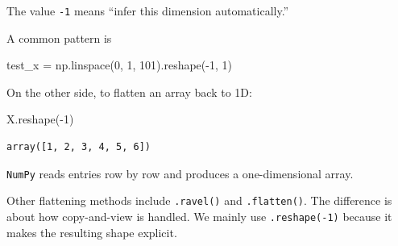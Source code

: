 \documentclass[
  letterpaper,
  DIV=11,
  numbers=noendperiod]{scrreprt}
\newenvironment{Shaded}{\begin{snugshade}}{\end{snugshade}}
\newcommand{\DecValTok}[1]{\textcolor[rgb]{0.68,0.00,0.00}{#1}}
\newcommand{\NormalTok}[1]{\textcolor[rgb]{0.00,0.23,0.31}{#1}}
\newcommand{\OperatorTok}[1]{\textcolor[rgb]{0.37,0.37,0.37}{#1}}
\theoremstyle{definition}
\theoremstyle{definition}
\theoremstyle{plain}
\theoremstyle{plain}
\theoremstyle{remark}
\begin{document}
The value \texttt{-1} means ``infer this dimension automatically.''

A common pattern is

\begin{Shaded}
\begin{Highlighting}[]
\NormalTok{test\_x }\OperatorTok{=}\NormalTok{ np.linspace(}\DecValTok{0}\NormalTok{, }\DecValTok{1}\NormalTok{, }\DecValTok{101}\NormalTok{).reshape(}\OperatorTok{{-}}\DecValTok{1}\NormalTok{, }\DecValTok{1}\NormalTok{)}
\end{Highlighting}
\end{Shaded}

On the other side, to flatten an array back to 1D:

\begin{Shaded}
\begin{Highlighting}[]
\NormalTok{X.reshape(}\OperatorTok{{-}}\DecValTok{1}\NormalTok{)}
\end{Highlighting}
\end{Shaded}

\begin{verbatim}
array([1, 2, 3, 4, 5, 6])
\end{verbatim}

\texttt{NumPy} reads entries row by row and produces a one-dimensional
array.

\begin{tcolorbox}[enhanced jigsaw, arc=.35mm, bottomrule=.15mm, bottomtitle=1mm, breakable, colback=white, colbacktitle=quarto-callout-tip-color!10!white, colframe=quarto-callout-tip-color-frame, coltitle=black, left=2mm, leftrule=.75mm, opacityback=0, opacitybacktitle=0.6, rightrule=.15mm, title=\textcolor{quarto-callout-tip-color}{\faLightbulb}\hspace{0.5em}{Tip}, titlerule=0mm, toprule=.15mm, toptitle=1mm]

Other flattening methods include \texttt{.ravel()} and
\texttt{.flatten()}. The difference is about how copy-and-view is
handled. We mainly use \texttt{.reshape(-1)} because it makes the
resulting shape explicit.

\end{tcolorbox}
\end{document}
